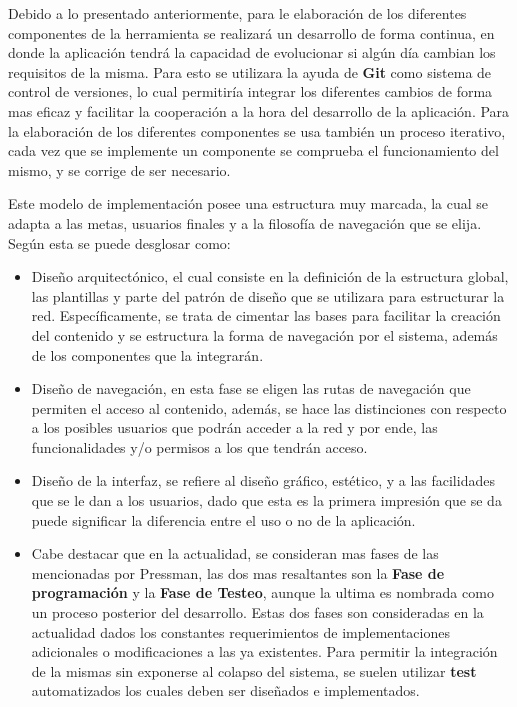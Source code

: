 Debido a lo presentado anteriormente, para le elaboración de los diferentes
componentes de la herramienta se realizará un desarrollo de forma continua,
en donde la aplicación tendrá la capacidad de evolucionar si algún día
cambian los requisitos de la misma. Para esto se utilizara la ayuda de
\textbf{Git} como sistema de control de versiones, lo cual permitiría integrar
los diferentes cambios de forma mas eficaz y facilitar la cooperación a la
hora del desarrollo de la aplicación. Para la elaboración de los diferentes
componentes se usa también un proceso iterativo, cada vez que se implemente
un componente se comprueba el funcionamiento del mismo, y se corrige de ser
necesario.

Este modelo de implementación posee una estructura muy marcada, la cual se adapta
a las metas, usuarios finales y a la filosofía de navegación que se elija.
Según \cite{pressman2002} esta se puede desglosar como:

\begin{itemize}
    \item Diseño arquitectónico, el cual consiste en la definición de la
        estructura global, las plantillas y parte del patrón de diseño que se
        utilizara para estructurar la red. Específicamente, se trata de cimentar
        las bases para facilitar la creación del contenido y se estructura la
        forma de navegación por el sistema, además de los componentes que la
        integrarán.

    \item Diseño de navegación, en esta fase se eligen las rutas de navegación
        que permiten el acceso al contenido, además, se hace las distinciones
        con respecto a los posibles usuarios que podrán acceder a la red y
        por ende, las funcionalidades y/o permisos a los que tendrán acceso.

    \item Diseño de la interfaz, se refiere al diseño gráfico, estético, y a
        las facilidades que se le dan a los usuarios, dado que esta es la primera
        impresión que se da puede significar la diferencia entre el uso o no de
        la aplicación.

    \item Cabe destacar que en la actualidad, se consideran mas fases de las
        mencionadas por Pressman, las dos mas resaltantes son la
        \textbf{Fase de programación} y la \textbf{Fase de Testeo}, aunque la
        ultima es nombrada como un proceso posterior del desarrollo. Estas dos
        fases son consideradas en la actualidad dados los constantes requerimientos
        de implementaciones adicionales o modificaciones a las ya existentes.
        Para permitir la integración de la mismas sin exponerse al colapso del
        sistema, se suelen utilizar \textbf{test} automatizados los cuales deben
        ser diseñados e implementados.

\end{itemize}

